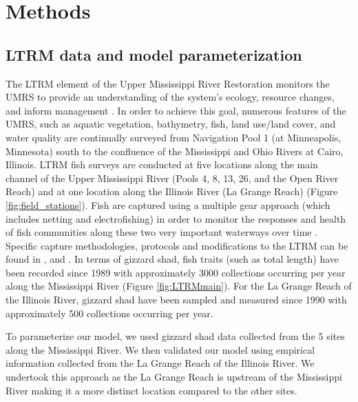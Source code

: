 \documentclass[preprint,review,12pt,authoryear]{elsarticle}
\begin{document}
\section{Methods}
\subsection{LTRM data and model parameterization} \label{LTRM}
The LTRM element of the Upper Mississippi River Restoration monitors the UMRS to provide an understanding of the system's ecology, resource changes, and inform management \citep{bouska2018developing}.
In order to achieve this goal, numerous features of the UMRS, such as aquatic vegetation, bathymetry, fish, land use/land cover, and water quality are continually surveyed from Navigation Pool 1 (at Minneapolis, Minnesota) south to the confluence of the Mississippi and Ohio Rivers at Cairo, Illinois. 
LTRM fish surveys are conducted at five locations along the main channel of the Upper Mississippi River (Pools 4, 8, 13, 26, and the Open River Reach) and at one location along the Illinois River (La Grange Reach) (Figure \ref{fig:field_stations}). 
Fish are captured using a multiple gear approach (which includes netting and electrofishing) in order to monitor the responses and health of fish communities along these two very important waterways over time \citep{gutreuter1995long}. 
Specific capture methodologies, protocols and modifications to the LTRM can be found in \cite{gutreuter1995long}, and \cite{ickes2002evaluation}. 
In terms of gizzard shad, fish traits (such as total length) have been recorded since 1989 with approximately 3000 collections occurring per year along the Mississippi River (Figure \ref{fig:LTRMmain}). 
For the La Grange Reach of the Illinois River, gizzard shad have been sampled and measured since 1990 with approximately 500 collections occurring per year.

To parameterize our model, we used gizzard shad data collected from the 5 sites along the Mississippi River.  
We then validated our model using empirical information collected from the La Grange Reach of the Illinois River. 
We undertook this approach as the La Grange Reach is upstream of the Mississippi River making it a more distinct location compared to the other sites. 
\end{document}
